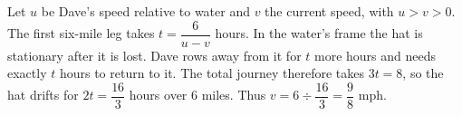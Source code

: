 Let $u$ be Dave's speed relative to water and $v$ the current speed, with $u>v>0$. The first six-mile leg takes $t=\dfrac{6}{u-v}$ hours. In the water's frame the hat is stationary after it is lost. Dave rows away from it for $t$ more hours and needs exactly $t$ hours to return to it. The total journey therefore takes $3t=8$, so the hat drifts for $2t=\dfrac{16}{3}$ hours over $6$ miles. Thus $v=6\div\dfrac{16}{3}=\boxed{\dfrac{9}{8}\text{ mph}}$.
